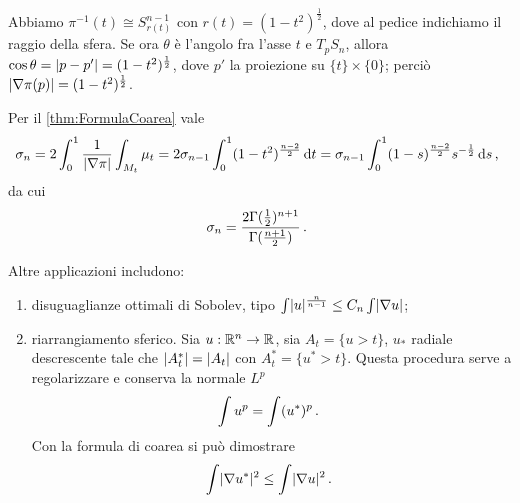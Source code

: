 Abbiamo $\pi^{-1}(t) \cong S^{n-1}_{r(t)}$ con $r(t) = (1-t^2)^{\frac 12}$, dove al pedice indichiamo il raggio della sfera.
Se ora $\theta$ è l'angolo fra l'asse $t$ e $T_pS_n$, allora $\cos\theta = \lvert p-p'\rvert = (1-t^2)^{\frac 12}$, dove $p'$ la proiezione su $\{t\}\times \{0\}$; perciò $\lvert\nabla \pi(p)\rvert = (1-t^2)^{\frac 12}$.

Per il \cref{thm:FormulaCoarea} vale
\begin{equation*}
	\sigma_n = 2\int_0^1 \frac 1{\lvert\nabla \pi\rvert} \int_{M_t} \mu_t = 2\sigma_{n-1} \int_0^1 (1-t^2)^{\frac{n-2}{2}} \,\mathrm d t = \sigma_{n-1} \int_0^1 (1-s)^{\frac{n-2}{2}} s^{-\frac 12} \,\mathrm d s \, \text{, }
\end{equation*}
da cui 
\begin{equation*}
	\sigma_n = \frac{2\Gamma(\frac 12)^{n+1}}{\Gamma(\frac{n+1}2)} \, \text{. }
\end{equation*}

Altre applicazioni includono:
\begin{enumerate}
	\item disuguaglianze ottimali di Sobolev, tipo $\int \lvert u\rvert^{\frac n{n-1}} \le C_n \int \lvert\nabla u\rvert$;
	
	\item riarrangiamento sferico. Sia $u:\mathbb R^n\to \mathbb R$, sia $A_t = \{ u> t \}$, $u_*$ radiale descrescente tale che $\lvert A_t^*\rvert = \lvert A_t\rvert$ con $A_t^* = \{u^*>t\}$. Questa procedura serve a regolarizzare e conserva la normale $L^p$
	\begin{equation*}
		\int u^p = \int (u^*)^p \, \text{. }
	\end{equation*}
	Con la formula di coarea si può dimostrare
	\begin{equation*}
		\int \lvert\nabla u^*\rvert^2 \le \int \lvert\nabla u\rvert^2 \, \text{. }
	\end{equation*}
	
\end{enumerate}







